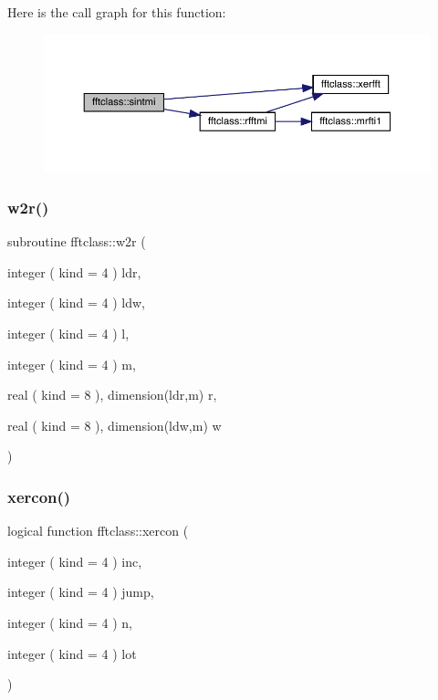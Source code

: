 Here is the call graph for this function\+:\nopagebreak
\begin{figure}[H]
\begin{center}
\leavevmode
\includegraphics[width=350pt]{namespacefftclass_a9b28ecda04690fe2a4425da2b5625e4d_cgraph}
\end{center}
\end{figure}
\mbox{\label{namespacefftclass_af191171f5e31fbad6c0e224faaf6175e}} 
\subsubsection{\texorpdfstring{w2r()}{w2r()}}
{\footnotesize\ttfamily subroutine fftclass\+::w2r (\begin{DoxyParamCaption}\item[{integer ( kind = 4 )}]{ldr,  }\item[{integer ( kind = 4 )}]{ldw,  }\item[{integer ( kind = 4 )}]{l,  }\item[{integer ( kind = 4 )}]{m,  }\item[{real ( kind = 8 ), dimension(ldr,m)}]{r,  }\item[{real ( kind = 8 ), dimension(ldw,m)}]{w }\end{DoxyParamCaption})}

\mbox{\label{namespacefftclass_a16b89da06cf17773f6b5aec6883952c2}} 
\subsubsection{\texorpdfstring{xercon()}{xercon()}}
{\footnotesize\ttfamily logical function fftclass\+::xercon (\begin{DoxyParamCaption}\item[{integer ( kind = 4 )}]{inc,  }\item[{integer ( kind = 4 )}]{jump,  }\item[{integer ( kind = 4 )}]{n,  }\item[{integer ( kind = 4 )}]{lot }\end{DoxyParamCaption})}

